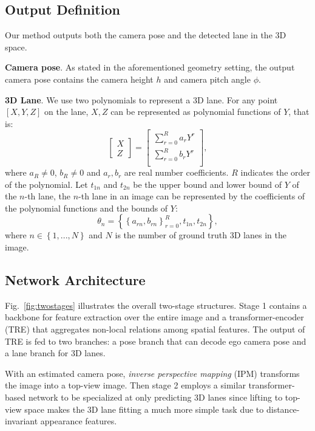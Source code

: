 \documentclass[letterpaper]{article} \usepackage{aaai22}  \usepackage{times}  \usepackage{helvet}  \usepackage{courier}  \usepackage[hyphens]{url}  \usepackage{graphicx} \urlstyle{rm} \def\UrlFont{\rm}  \usepackage{natbib}  \usepackage{caption}
\begin{document}
\subsection{Output Definition}
Our method outputs both the camera pose and the detected lane in the 3D space. 

\noindent \textbf{Camera pose}.
As stated in the aforementioned geometry setting, the output camera pose contains the camera height $h$ and camera pitch angle $\phi$.

\noindent \textbf{3D Lane}. We use two polynomials to represent a 3D lane. For any point $[X,Y,Z]$ on the lane, $X,Z$ can be represented as polynomial functions of $Y$, that is:
\begin{equation}
\label{eq:3dshape}
\begin{bmatrix}
   X \\
   Z
\end{bmatrix}
=
\begin{bmatrix}
   \sum_{r=0}^R a_rY^r \\
   \sum_{r=0}^R b_rY^r \\
\end{bmatrix},
\end{equation}
where $a_R \neq 0$, $b_R \neq 0$ and $a_r, b_r$ are real number coefficients. $R$ indicates the order of the polynomial. Let $t_{1n}$ and $t_{2n}$ be the upper bound and lower bound of $Y$ of the $n$-th lane, the $n$-th lane in an image can be represented by the coefficients of the polynomial functions and the bounds of $Y$:
\begin{equation}
\label{eq:3dmodel}
\theta_n=\left\{\left\{a_{rn}, b_{rn}\right\}_{r=0}^R, t_{1n}, t_{2n}\right\},
\end{equation}
where $n \in \left\{1,...,N\right\}$ and $N$ is the number of ground truth 3D lanes in the image. 

\subsection{Network Architecture}

Fig.~\ref{fig:twostages} illustrates the overall two-stage structures. Stage 1 contains a backbone for feature extraction over the entire image and a transformer-encoder (TRE) that aggregates non-local relations among spatial features. The output of TRE is fed to two branches: a pose branch that can decode ego camera pose and a lane branch for 3D lanes.

With an estimated camera pose, \textit{inverse perspective mapping} (IPM) transforms the image into a top-view image. Then stage 2 employs a similar transformer-based network to be specialized at only predicting 3D lanes since lifting to top-view space makes the 3D lane fitting a much more simple task due to distance-invariant appearance features.   
\end{document}
